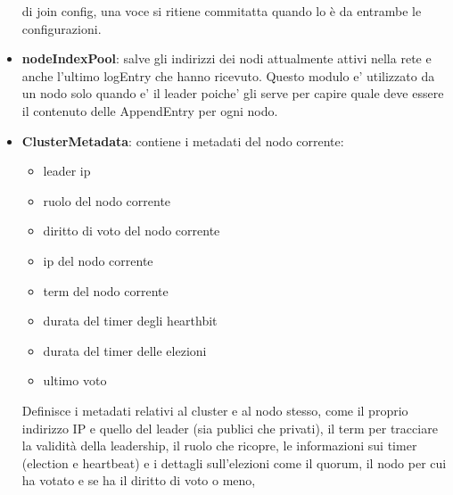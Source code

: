\begin{itemize}
    di join config, una voce si ritiene commitatta quando lo è da entrambe le configurazioni.
    \item \textbf{nodeIndexPool}: 
        salve gli indirizzi dei nodi attualmente attivi nella rete e anche l'ultimo logEntry
        che hanno ricevuto. Questo modulo e' utilizzato da un nodo solo quando e' il leader
        poiche' gli serve per capire quale deve essere il contenuto delle AppendEntry per ogni nodo.
    \item \textbf{ClusterMetadata}: contiene i metadati del nodo corrente:
        \begin{itemize}
            \item leader ip
            \item ruolo del nodo corrente
            \item diritto di voto del nodo corrente
            \item ip del nodo corrente
            \item term del nodo corrente
            \item durata del timer degli hearthbit 
            \item durata del timer delle elezioni
            \item ultimo voto
        \end{itemize}
        Definisce i metadati relativi al cluster e al nodo stesso, come il proprio indirizzo IP e quello del leader (sia publici che privati), il term per tracciare la validità della leadership, il ruolo 
        che ricopre, le informazioni sui timer (election e heartbeat) e i dettagli 
        sull'elezioni come il quorum, il nodo per cui ha votato e se ha il diritto di voto o meno, 


\end{itemize}
